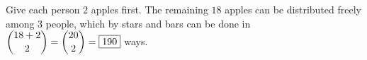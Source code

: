 Give each person \(2\) apples first. The remaining \(18\) apples can be distributed freely among \(3\) people, which by stars and bars can be done in \(\dbinom{18+2}{2}=\dbinom{20}{2}=\boxed{190}\) ways.
